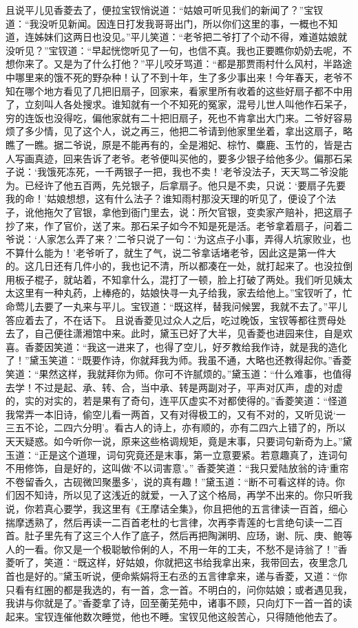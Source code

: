 \documentclass[12pt,oneside]{book}
\begin{document}
且说平儿见香菱去了，便拉宝钗悄说道：“姑娘可听见我们的新闻了？”宝钗道：“我没听见新闻。因连日打发我哥哥出门，所以你们这里的事，一概也不知道，连姊妹们这两日也没见。”平儿笑道：“老爷把二爷打了个动不得，难道姑娘就没听见？”宝钗道：“早起恍惚听见了一句，也信不真。我也正要瞧你奶奶去呢，不想你来了。又是为了什么打他？”平儿咬牙骂道：“都是那贾雨村什么风村，半路途中哪里来的饿不死的野杂种！认了不到十年，生了多少事出来！今年春天，老爷不知在哪个地方看见了几把旧扇子，回家来，看家里所有收着的这些好扇子都不中用了，立刻叫人各处搜求。谁知就有一个不知死的冤家，混号儿世人叫他作石呆子，穷的连饭也没得吃，偏他家就有二十把旧扇子，死也不肯拿出大门来。二爷好容易烦了多少情，见了这个人，说之再三，他把二爷请到他家里坐着，拿出这扇子，略瞧了一瞧。据二爷说，原是不能再有的，全是湘妃、棕竹、麋鹿、玉竹的，皆是古人写画真迹，回来告诉了老爷。老爷便叫买他的，要多少银子给他多少。偏那石呆子说：‘我饿死冻死，一千两银子一把，我也不卖！’老爷没法子，天天骂二爷没能为。已经许了他五百两，先兑银子，后拿扇子。他只是不卖，只说：‘要扇子先要我的命！’姑娘想想，这有什么法子？谁知雨村那没天理的听见了，便设了个法子，讹他拖欠了官银，拿他到衙门里去，说：所欠官银，变卖家产赔补，把这扇子抄了来，作了官价，送了来。那石呆子如今不知是死是活。老爷拿着扇子，问着二爷说：‘人家怎么弄了来？’二爷只说了一句：‘为这点子小事，弄得人坑家败业，也不算什么能为！’老爷听了，就生了气，说二爷拿话堵老爷，因此这是第一件大的。这几日还有几件小的，我也记不清，所以都凑在一处，就打起来了。也没拉倒用板子棍子，就站着，不知拿什么，混打了一顿，脸上打破了两处。我们听见姨太太这里有一种丸药，上棒疮的，姑娘快寻一丸子给我，家去给他上。”宝钗听了，忙命莺儿去要了一丸来与平儿。宝钗道：“既这样，替我问候罢，我就不去了。”平儿答应着去了，不在话下。
且说香菱见过众人之后，吃过晚饭，宝钗等都往贾母处去了，自己便往潇湘馆中来。此时，黛玉已好了大半，见香菱也进园来住，自是欢喜。香菱因笑道：“我这一进来了，也得了空儿，好歹教给我作诗，就是我的造化了！”黛玉笑道：“既要作诗，你就拜我为师。我虽不通，大略也还教得起你。”香菱笑道：“果然这样，我就拜你为师。你可不许腻烦的。”黛玉道：“什么难事，也值得去学！不过是起、承、转、合，当中承、转是两副对子，平声对仄声，虚的对虚的，实的对实的，若是果有了奇句，连平仄虚实不对都使得的。”香菱笑道：“怪道我常弄一本旧诗，偷空儿看一两首，又有对得极工的，又有不对的，又听见说‘一三五不论，二四六分明’。看古人的诗上，亦有顺的，亦有二四六上错了的，所以天天疑惑。如今听你一说，原来这些格调规矩，竟是末事，只要词句新奇为上。”黛玉道：“正是这个道理，词句究竟还是末事，第一立意要紧。若意趣真了，连词句不用修饰，自是好的，这叫做‘不以词害意’。”
香菱笑道：“我只爱陆放翁的诗‘重帘不卷留香久，古砚微凹聚墨多’，说的真有趣！”黛玉道：“断不可看这样的诗。你们因不知诗，所以见了这浅近的就爱，一入了这个格局，再学不出来的。你只听我说，你若真心要学，我这里有《王摩诘全集》，你且把他的五言律读一百首，细心揣摩透熟了，然后再读一二百首老杜的七言律，次再李青莲的七言绝句读一二百首。肚子里先有了这三个人作了底子，然后再把陶渊明、应玚，谢、阮、庚、鲍等人的一看。你又是一个极聪敏伶俐的人，不用一年的工夫，不愁不是诗翁了！”香菱听了，笑道：“既这样，好姑娘，你就把这书给我拿出来，我带回去，夜里念几首也是好的。”黛玉听说，便命紫娟将王右丞的五言律拿来，递与香菱，又道：“你只看有红圈的都是我选的，有一首，念一首。不明白的，问你姑娘；或者遇见我，我讲与你就是了。”香菱拿了诗，回至蘅芜苑中，诸事不顾，只向灯下一首一首的读起来。宝钗连催他数次睡觉，他也不睡。宝钗见他这般苦心，只得随他他去了。
\end{document}
